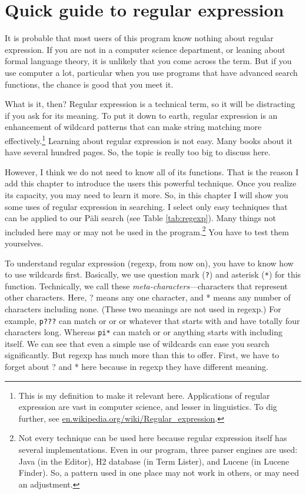 \chapter{Quick guide to regular expression}\label{chap:regexp}

It is probable that most users of this program know nothing about regular expression. If you are not in a computer science department, or leaning about formal language theory, it is unlikely that you come across the term. But if you use computer a lot, particular when you use programs that have advanced search functions, the chance is good that you meet it.

What is it, then? Regular expression is a technical term, so it will be distracting if you ask for its meaning. To put it down to earth, regular expression is an enhancement of wildcard patterns that can make string matching more effectively.\footnote{This is my definition to make it relevant here. Applications of regular expression are vast in computer science, and lesser in linguistics. To dig further, see \url{en.wikipedia.org/wiki/Regular\_expression}.} Learning about regular expression is not easy. Many books about it have several hundred pages. So, the topic is really too big to discuss here.

However, I think we do not need to know all of its functions. That is the reason I add this chapter to introduce the users this powerful technique. Once you realize its capacity, you may need to learn it more. So, in this chapter I will show you some uses of regular expression in searching. I select only easy techniques that can be applied to our Pāli search (see Table \ref{tab:regexp}). Many things not included here may or may not be used in the program.\footnote{Not every technique can be used here because regular expression itself has several implementations. Even in our program, three parser engines are used: Java (in the Editor), H2 database (in Term Lister), and Lucene (in Lucene Finder). So, a pattern used in one place may not work in others, or may need an adjustment.} You have to test them yourselves.

To understand regular expression (regexp, from now on), you have to know how to use wildcards first. Basically, we use question mark (\texttt{?}) and asterisk (\texttt{*}) for this function. Technically, we call these \emph{meta-characters}---characters that represent other characters. Here, ? means any one character, and * means any number of characters including none. (These two meanings are not used in regexp.) For example, \texttt{p???} can match  or  or  or whatever that starts with  and have totally four characters long. Whereas \texttt{pi*} can match  or  or anything starts with  including  itself. We can see that even a simple use of wildcards can ease you search significantly. But regexp has much more than this to offer. First, we have to forget about ? and * here because in regexp they have different meaning.

